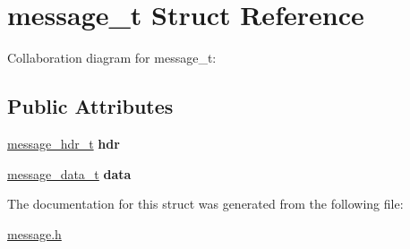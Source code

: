 \hypertarget{structmessage__t}{}\section{message\+\_\+t Struct Reference}
\label{structmessage__t}


Collaboration diagram for message\+\_\+t\+:
\subsection*{Public Attributes}
\begin{DoxyCompactItemize}
\item 
\hyperlink{structmessage__hdr__t}{message\+\_\+hdr\+\_\+t} {\bfseries hdr}\hypertarget{structmessage__t_a6c9e3c76c26fd15afd27fca633875978}{}\label{structmessage__t_a6c9e3c76c26fd15afd27fca633875978}

\item 
\hyperlink{structmessage__data__t}{message\+\_\+data\+\_\+t} {\bfseries data}\hypertarget{structmessage__t_a4246f40b480c7d84ff6319ef2ae7b305}{}\label{structmessage__t_a4246f40b480c7d84ff6319ef2ae7b305}

\end{DoxyCompactItemize}


The documentation for this struct was generated from the following file\+:\begin{DoxyCompactItemize}
\item 
\hyperlink{message_8h}{message.\+h}\end{DoxyCompactItemize}
